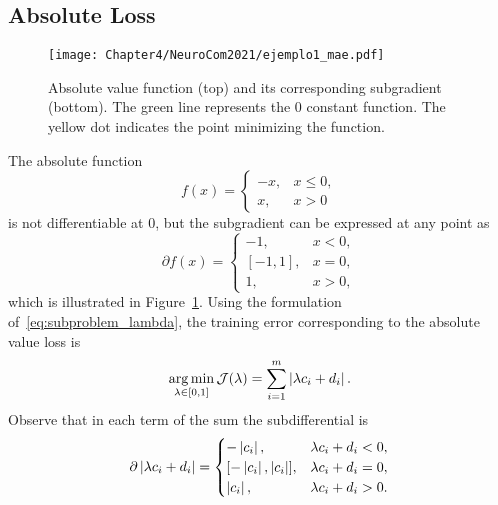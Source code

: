 \subsection{Absolute Loss}
\begin{figure}[t!]
    \centering
    \texttt{[image: Chapter4/NeuroCom2021/ejemplo1\_mae.pdf]}
    \caption{Absolute value function (top) and its corresponding subgradient (bottom). The green line represents the $0$ constant function. The yellow dot indicates the point minimizing the function.}
    \label{fig:abs_loss}
\end{figure}
The absolute function 
\begin{equation}
    \nonumber
    f(x) = 
    \begin{cases}
    -x ,& x \leq 0, \\
    x ,& x > 0    
    \end{cases}
\end{equation}
is not differentiable at $0$, but the subgradient can be expressed at any point as
\begin{equation}
    \nonumber
    \partial f(x) = 
    \begin{cases}
    -1 ,& x < 0, \\
    [-1, 1] ,& x = 0 , \\
    1 ,& x > 0 ,
    \end{cases}
\end{equation}
which is illustrated in Figure~\ref{fig:abs_loss}.
Using the formulation of~\eqref{eq:subproblem_lambda}, the training error corresponding to the absolute value loss is
\begin{equation}
    \label{eq:opt_abs}
    \argmin_{\lambda \in [0, 1]} \mathcal{J}(\lambda) = \sum_{i=1}^{\npertask} \abs{\lambda c_i + d_i}.
\end{equation}
Observe that in each term of the sum the subdifferential is 
\begin{equation}
    \label{eq:subdiff_abs}
    \begin{aligned}
        \partial \abs{\lambda c_i + d_i} = 
    \begin{cases}
        -\abs{c_i} ,& \lambda c_i + d_i  < 0, \\
        [-\abs{c_i}, \abs{c_i}] ,& \lambda c_i + d_i  = 0, \\
        \abs{c_i} ,& \lambda c_i + d_i  > 0 .\\
    \end{cases}
    \end{aligned}
\end{equation}
